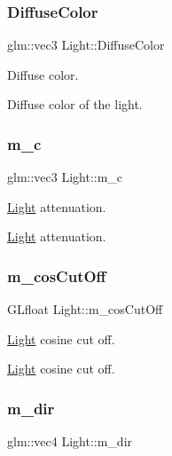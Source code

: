 \subsubsection{\texorpdfstring{Diffuse\+Color}{DiffuseColor}}
{\footnotesize\ttfamily glm\+::vec3 Light\+::\+Diffuse\+Color}



Diffuse color. 

Diffuse color of the light. \mbox{\label{class_light_a31a4d7e3042d7ffe99e3070bcaa6aa61}} 
\subsubsection{\texorpdfstring{m\+\_\+c}{m\_c}}
{\footnotesize\ttfamily glm\+::vec3 Light\+::m\+\_\+c\hspace{0.3cm}{\ttfamily [protected]}}



\hyperlink{class_light}{Light} attenuation. 

\hyperlink{class_light}{Light} attenuation. \mbox{\label{class_light_a5f99e10dc1c5c49785c4523d09588eef}} 
\subsubsection{\texorpdfstring{m\+\_\+cos\+Cut\+Off}{m\_cosCutOff}}
{\footnotesize\ttfamily G\+Lfloat Light\+::m\+\_\+cos\+Cut\+Off\hspace{0.3cm}{\ttfamily [protected]}}



\hyperlink{class_light}{Light} cosine cut off. 

\hyperlink{class_light}{Light} cosine cut off. \mbox{\label{class_light_a837f0e73f495fd9361b6eecaafaef275}} 
\subsubsection{\texorpdfstring{m\+\_\+dir}{m\_dir}}
{\footnotesize\ttfamily glm\+::vec4 Light\+::m\+\_\+dir\hspace{0.3cm}{\ttfamily [protected]}}



